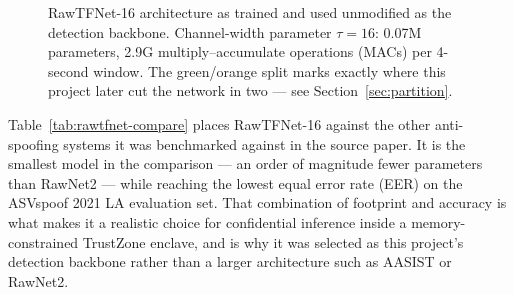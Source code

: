 \documentclass[11pt,a4paper]{report}
\begin{document}
\begin{figure}[H]
\centering
{}
\caption{RawTFNet-16 architecture as trained and used unmodified as the detection backbone.
Channel-width parameter $\tau=16$: 0.07M parameters, 2.9G multiply--accumulate operations (MACs)
per 4-second window. The green/orange split marks exactly where this project later cut the network
in two --- see Section~\ref{sec:partition}.}
\label{fig:rawtfnet-arch}
\end{figure}

Table~\ref{tab:rawtfnet-compare} places RawTFNet-16 against the other anti-spoofing systems it was
benchmarked against in the source paper. It is the smallest model in the comparison --- an order of
magnitude fewer parameters than RawNet2 --- while reaching the lowest equal error rate (EER) on the
ASVspoof 2021 LA evaluation set. That combination of footprint and accuracy is what makes it a
realistic choice for confidential inference inside a memory-constrained TrustZone enclave, and is
why it was selected as this project's detection backbone rather than a larger architecture such as
AASIST or RawNet2.
\end{document}
